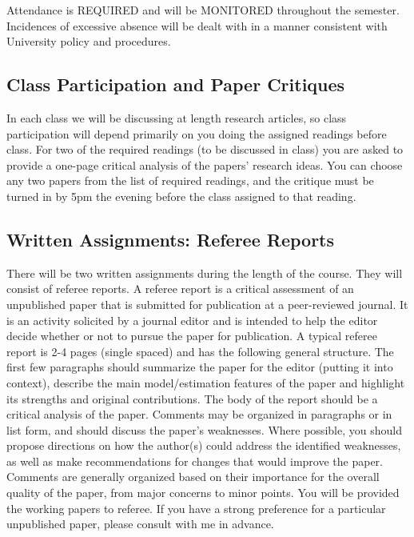 \documentclass[10pt]{article}
\begin{document}
Attendance is REQUIRED and will be MONITORED throughout the semester.  Incidences of excessive absence will be dealt with in a manner consistent with University policy and procedures. 

\subsection*{Class Participation and Paper Critiques}

In each class we will be discussing at length research articles, so class participation will depend primarily on you doing the assigned readings before class. 
For two of the required readings (to be discussed in class) you are asked to provide a one-page critical analysis of the papers’ research ideas. 
You can choose any two papers from the list of required readings, and the critique must be turned in by 5pm the evening before the class assigned to that reading.

\subsection*{Written Assignments: Referee Reports} 

There will be two written assignments during the length of the course. They will consist of referee reports. 
A referee report is a critical assessment of an unpublished paper that is submitted for publication at a peer-reviewed journal. 
It is an activity solicited by a journal editor and is intended to help the editor decide whether or not to pursue the paper for publication.
A typical referee report is 2-4 pages (single spaced) and has the following general structure. 
The first few paragraphs should summarize the paper for the editor (putting it into context), describe the main model/estimation features of the paper and highlight its strengths and original contributions. 
The body of the report should be a critical analysis of the paper. 
Comments may be organized in paragraphs or in list form, and should discuss the paper’s weaknesses. 
Where possible, you should propose directions on how the author(s) could address the identified weaknesses, as well as make recommendations for changes that would improve the paper. 
Comments are generally organized based on their importance for the overall quality of the paper, from major concerns to minor points.
You will be provided the working papers to referee. 
If you have a strong preference for a particular unpublished paper, please consult with me in advance.
\end{document}
